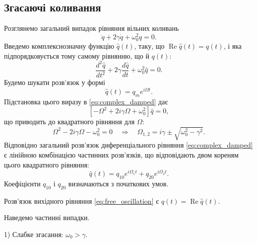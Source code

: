 \subsection*{Згасаючі коливання}

Розглянемо загальний випадок рівняння вільних коливань
\begin{equation}\label{eq:damped_equation}
	\ddot{q} + 2\gamma\dot{q} + \omega_0^2 q = 0.
\end{equation}
Введемо комплекснозначну функцію $\hat{q}(t)$, таку, що $\operatorname{Re}\hat{q}(t) = q(t)$, і
яка підпорядковується тому самому рівнянню, що й $q(t)$:
\begin{equation}\label{eq:complex_damped}
	\frac{d^2\hat{q}}{dt^2} + 2\gamma\frac{d\hat{q}}{dt} + \omega_0^2\hat{q} = 0.
\end{equation}
Будемо шукати розв'язок у формі
\begin{equation}\label{eq:complex_ansatz}
	\hat{q}(t) = q_m e^{i\Omega t}.
\end{equation}
Підстановка цього виразу в \eqref{eq:complex_damped} дає
\begin{equation}\label{eq:characteristic}
	\left[-\Omega^2 + 2i\gamma\Omega + \omega_0^2\right]\hat{q} = 0,
\end{equation}
що приводить до квадратного рівняння для $\Omega$:
\begin{equation}\label{eq:Omega_roots}
	\Omega^2 - 2i\gamma\Omega - \omega_0^2 = 0
	\quad\Rightarrow\quad
	\Omega_{1,2} = i\gamma \pm \sqrt{\omega_0^2 - \gamma^2}.
\end{equation}
Відповідно загальний розв'язок диференціального рівняння \eqref{eq:complex_damped}
є лінійною комбінацією частинних розв'язків, що відповідають двом кореням
цього квадратного рівняння:
\begin{equation}\label{eq:general_solution}
	\hat{q}(t) = q_{10} e^{i\Omega_1 t} + q_{20} e^{i\Omega_2 t}.
\end{equation}
Коефіцієнти $q_{10}$ і $q_{20}$ визначаються з початкових умов.

Розв'язок вихідного рівняння \eqref{eq:free_oscillation} є $q(t) = \operatorname{Re}\hat{q}(t)$.

Наведемо частинні випадки.

1) Слабке згасання: $\omega_0 > \gamma$.

